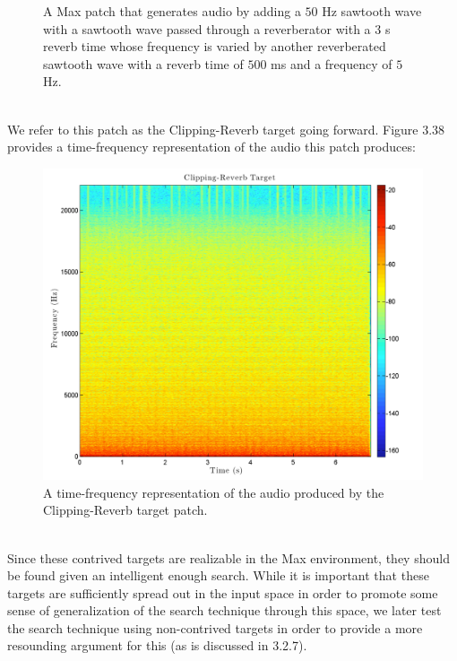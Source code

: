 \documentclass[a4paper,12pt]{report} 	%
\numberwithin{figure}{chapter}
\numberwithin{table}{chapter}
\numberwithin{equation}{chapter}
\begin{document}
\begin{flushleft}
\begin{figure}[h!]
\begin{center}
\caption[Clipping Reverb Sawtooth Max Patch]{A Max patch that generates audio by adding a $50$ Hz sawtooth wave with a sawtooth wave passed through a reverberator with a $3$ s reverb time whose frequency is varied by another reverberated sawtooth wave with a reverb time of $500$ ms and a frequency of $5$ Hz.}
\end{center}
\end{figure}
\\
We refer to this patch as the Clipping-Reverb target going forward. Figure 3.38 provides a time-frequency representation of the audio this patch produces:
\begin{figure}[h!]
\begin{center}
\includegraphics[scale=0.35,width=\linewidth]{ClippingReverbTarget}
\caption[Clipping Reverb Sawtooth Time-Frequency Representation]{A time-frequency representation of the audio produced by the Clipping-Reverb target patch.}
\end{center}
\end{figure}
\\
Since these contrived targets are realizable in the Max environment, they should be found given an intelligent enough search. While it is important that these targets are sufficiently spread out in the input space in order to promote some sense of generalization of the search technique through this space, we later test the search technique using non-contrived targets in order to provide a more resounding argument for this (as is discussed in 3.2.7).


\end{flushleft}
\end{document}
